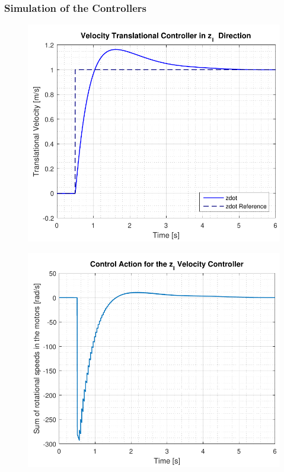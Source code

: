 \subsubsection{Simulation of the Controllers}

\begin{minipage}{\linewidth}
    \begin{minipage}{0.5\linewidth}
        \begin{figure}[H]
            \includegraphics[scale=.55]{figures/velocityControllerZ}
            \centering			
            \label{fig:velocityControllerZ}
        \end{figure}
    \end{minipage}
    \hspace{0.03\linewidth}
    \begin{minipage}{0.5\linewidth}
        \begin{figure}[H]
            \includegraphics[scale=.55]{figures/velocityControllerZAction}

\end{figure}
\end{minipage}
\end{minipage}

